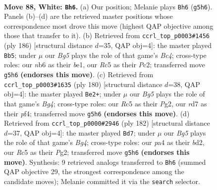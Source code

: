 \documentclass[11pt]{article}
\begin{document}
\clearpage

\begin{figure}[p]\centering
\begin{subfigure}{0.46\textwidth}\centering
\resizebox{\linewidth}{!}{%
\newchessgame
\chessboard[
  setfen={7k/3r4/1n6/2R3B1/p4P1P/P7/7K/8 w - - 1 88},
  showmover=false,
  pgfstyle=straightmove, color=movearrow, markmove={g5-h6}
]}
\caption{}
\end{subfigure}\hfill
\begin{subfigure}{0.46\textwidth}\centering
\resizebox{\linewidth}{!}{%
\newchessgame
\chessboard[
  setfen={8/8/3k4/p7/P1Bp2K1/3P4/2P5/4b3 w - - 49 94},
  showmover=false,
  pgfstyle=straightmove, color=movearrow, markmove={c4-b5}
]}
\caption{}
\end{subfigure}
\\[4pt]
\begin{subfigure}{0.46\textwidth}\centering
\resizebox{\linewidth}{!}{%
\newchessgame
\chessboard[
  setfen={8/8/1b6/1P6/2k2pBp/7P/6P1/2K5 w - - 56 91},
  showmover=false,
  pgfstyle=straightmove, color=movearrow, markmove={g4-e2}
]}
\caption{}
\end{subfigure}\hfill
\begin{subfigure}{0.46\textwidth}\centering
\resizebox{\linewidth}{!}{%
\newchessgame
\chessboard[
  setfen={8/8/k7/8/6Bp/P6P/K2b2P1/8 w - - 17 92},
  showmover=false,
  pgfstyle=straightmove, color=movearrow, markmove={g4-d7}
]}
\caption{}
\end{subfigure}
\caption{\textbf{Move 88, White: \texttt{Bh6}.} (a) Our position; Melanie plays \texttt{Bh6} (\texttt{g5h6}). Panels (b)--(d) are the retrieved master positions whose correspondence most drove this move (highest QAP objective among those that transfer to it). (b) Retrieved from \texttt{ccrl\_top\_p0003\#1456} (ply 186) [structural distance $d$=35, QAP obj=4]: the master played \texttt{Bb5}; under $\mu$ our \emph{Bg5} plays the role of that game's \emph{Bc4}; cross-type roles: our \emph{n}b6 as their \emph{b}e1, our \emph{R}c5 as their \emph{P}c2; transferred move \texttt{g5h6} \textbf{(endorses this move)}. (c) Retrieved from \texttt{ccrl\_top\_p0003\#1635} (ply 180) [structural distance $d$=38, QAP obj=4]: the master played \texttt{Be2+}; under $\mu$ our \emph{Bg5} plays the role of that game's \emph{Bg4}; cross-type roles: our \emph{R}c5 as their \emph{P}g2, our \emph{r}d7 as their \emph{p}f4; transferred move \texttt{g5h6} \textbf{(endorses this move)}. (d) Retrieved from \texttt{ccrl\_top\_p0000\#2946} (ply 182) [structural distance $d$=37, QAP obj=4]: the master played \texttt{Bd7}; under $\mu$ our \emph{Bg5} plays the role of that game's \emph{Bg4}; cross-type roles: our \emph{p}a4 as their \emph{b}d2, our \emph{R}c5 as their \emph{P}g2; transferred move \texttt{g5h6} \textbf{(endorses this move)}. Synthesis: 9 retrieved analogs transferred to \texttt{Bh6} (summed QAP objective 29, the strongest correspondence among the candidate moves); Melanie committed it via the \texttt{search} selector.}
\label{fig:thought-m174}
\end{figure}
\end{document}
